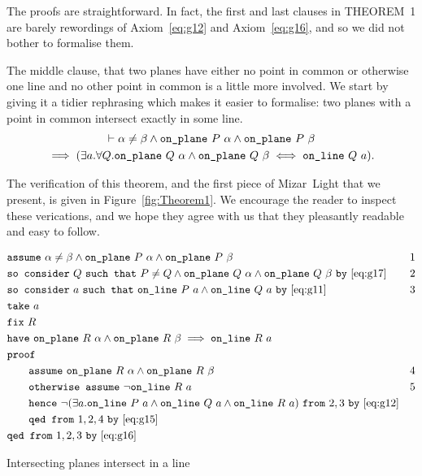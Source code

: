 The proofs are straightforward. In fact, the first and last clauses in THEOREM~1 are barely rewordings of Axiom~\ref{eq:g12} and Axiom~\ref{eq:g16}, and so we did not bother to formalise them.

The middle clause, that two planes have either no point in common or otherwise one line and no other point in common is a little more involved. We start by giving it a tidier rephrasing which makes it easier to formalise: two planes with a point in common intersect exactly in some line.
\begin{multline}
  \vdash \alpha \neq \beta \wedge \texttt{on\_plane}\ P\ \alpha \wedge \texttt{on\_plane}\ P\ \beta\\
  \implies (\exists a. \forall Q. \texttt{on\_plane}\ Q\ \alpha \wedge \texttt{on\_plane}\ Q\ \beta \iff \texttt{on\_line}\ Q\ a).
\end{multline}

The verification of this theorem, and the first piece of Mizar~Light that we present, is given in Figure~\ref{fig:Theorem1}. We encourage the reader to inspect these verications, and we hope they agree with us that they pleasantly readable and easy to follow. 

\begin{boxedfigure}
\small
  \begin{align*}
    &\code{assume}\ \alpha\neq\beta \wedge \code{on\_plane}\ P\ \alpha\wedge\code{on\_plane}\ P\ \beta & 1\\
    &\code{so consider}\ Q\ \code{such that}\ P\neq Q \wedge\code{on\_plane}\ Q\ \alpha \wedge\code{on\_plane}\ Q\ \beta\ \code{by}\ \eqref{eq:g17} & 2\\
    &\code{so consider}\ a\ \code{such that}\ \code{on\_line}\ P\ a\wedge\code{on\_line}\ Q\ a\ \code{by}\ \eqref{eq:g11} & 3\\
    &\code{take}\ a\\
    &\code{fix}\ R\\
    &\code{have}\ \code{on\_plane}\ R\ \alpha\wedge\code{on\_plane}\ R\ \beta \implies \code{on\_line}\ R\ a\\
    &\code{proof}\\
    &\qquad\code{assume}\ \code{on\_plane}\ R\ \alpha\wedge\code{on\_plane}\ R\ \beta & 4\\
    &\qquad\code{otherwise assume}\ \neg\code{on\_line}\ R\ a & 5\\
    &\qquad\code{hence}\ \Triangle{a}{P}{Q}{R}\ \code{from}\ 2,3\ \code{by}\ \eqref{eq:g12}\\
    &\qquad\code{qed from}\ 1,2,4\ \code{by}\ \eqref{eq:g15}\\
    &\code{qed from}\ 1,2,3\ \code{by}\ \eqref{eq:g16}
  \end{align*}
  \caption{Intersecting planes intersect in a line}
  \label{fig:Theorem1}
\end{boxedfigure}


